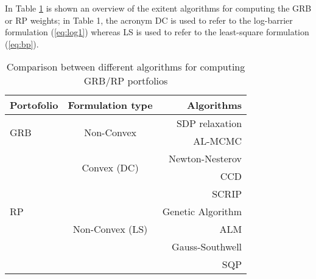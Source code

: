 In Table \ref{tab:t} is shown an overview of the exitent algorithms for computing the GRB or RP weights; in Table 1, the acronym DC is used to refer to the log-barrier formulation (\ref{eq:log1}) whereas LS is used to refer to the least-square formulation (\ref{eq:bp}).
\begin{table}
\begin{center}
\begin{tabular}{| l | c| r |}
\hline
    \textbf{Portofolio} &\textbf{Formulation type}& \textbf{Algorithms}  \\ \hline
    \multirow{2}{4em}{GRB}& \multirow{2}{6em}{Non-Convex}  &SDP relaxation \cite{sdp}  \\ \cline{3-3}
     &  &AL-MCMC \cite{sdp}\\ \hline
    \multirow{7}{4em}{RP}& \multirow{2}{6em}{Convex (DC)}  &Newton-Nesterov \cite{spinu}\\\cline{3-3}     
    &  & CCD \cite{ccd}\\ \cline{2-3}

     &\multirow{5}{8em}{Non-Convex (LS)} & SCRIP \cite{scrip}\\ \cline{3-3}
    && Genetic Algorithm \cite{genetic} \\\cline{3-3}
    && ALM \cite{tutuncu}\\ \cline{3-3}
    && Gauss-Southwell \\ \cline{3-3}
    && SQP \cite{erc}\\ 
    \hline
\end{tabular}
\end{center}
\caption{Comparison between different algorithms for computing GRB/RP portfolios}
\label{tab:t}
\end{table}
